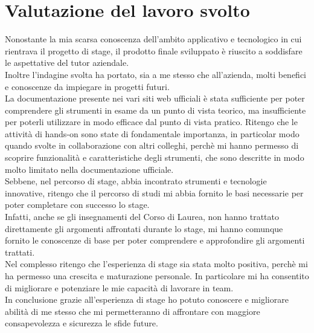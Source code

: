 \section{Valutazione del lavoro svolto}
Nonostante la mia scarsa conoscenza dell'ambito applicativo e tecnologico in cui rientrava il progetto di stage,
il prodotto finale sviluppato è riuscito a soddisfare le aspettative del tutor aziendale.\\
Inoltre l'indagine svolta 
ha portato, sia a me stesso che all'azienda,
 molti benefici e conoscenze da impiegare in progetti futuri.\\
La documentazione presente nei vari siti web ufficiali è stata sufficiente per poter comprendere gli strumenti in esame
da un punto di vista teorico, ma insufficiente 
per poterli utilizzare in modo efficace dal punto di vista pratico. Ritengo che 
le attività di \gls{hands-on}{} sono state di fondamentale importanza, in particolar modo 
quando svolte in collaborazione con altri colleghi, perchè mi hanno permesso di 
scoprire funzionalità e caratteristiche degli strumenti, che sono descritte in modo molto limitato nella documentazione ufficiale.\\
Sebbene, nel percorso di stage, abbia incontrato strumenti e tecnologie innovative, ritengo che il percorso di studi 
mi abbia fornito le basi necessarie per poter completare con successo lo stage.\\
Infatti, anche se gli insegnamenti del Corso di Laurea, non hanno trattato direttamente gli argomenti affrontati durante lo stage,
mi hanno comunque fornito le conoscenze di base per poter comprendere e approfondire gli argomenti trattati.\\
Nel complesso ritengo che l'esperienza di stage sia stata molto positiva, perchè 
mi ha permesso una crescita e maturazione personale. In particolare mi ha consentito di
migliorare e potenziare le mie capacità di lavorare in team.\\
In conclusione grazie all'esperienza di stage ho potuto conoscere e migliorare abilità di me stesso
 che mi permetteranno di affrontare con maggiore consapevolezza e sicurezza le sfide future.\\
\newpage
\pagestyle{empty}
\null %
\newpage